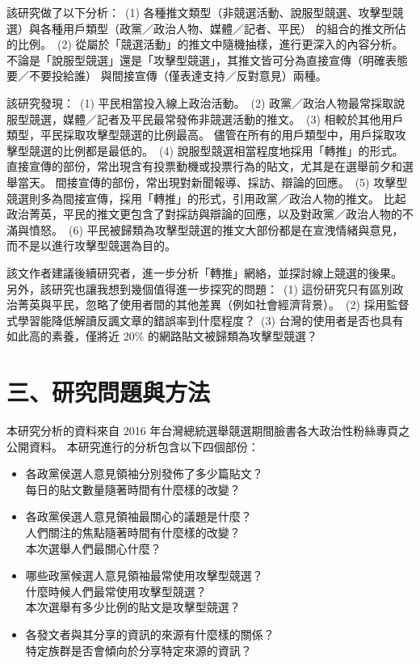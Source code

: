 \documentclass[a4paper, 10pt, conference]{ieeeconf}       %
\begin{document}
\begin{CJK}{UTF8}{bsmi}
該研究做了以下分析：%
\,(1) 各種推文類型（非競選活動、說服型競選、攻擊型競選）與各種用戶類型（政黨／政治人物、媒體／記者、平民）%
的組合的推文所佔的比例。%
\,(2) 從屬於「競選活動」的推文中隨機抽樣，進行更深入的內容分析。%
不論是「說服型競選」還是「攻擊型競選」，其推文皆可分為直接宣傳（明確表態要／不要投給誰）%
與間接宣傳（僅表達支持／反對意見）兩種。%

該研究發現：%
\,(1) 平民相當投入線上政治活動。%
\,(2) 政黨／政治人物最常採取說服型競選，媒體／記者及平民最常發佈非競選活動的推文。%
\,(3) 相較於其他用戶類型，平民採取攻擊型競選的比例最高。%
儘管在所有的用戶類型中，用戶採取攻擊型競選的比例都是最低的。%
\,(4) 說服型競選相當程度地採用「轉推」的形式。%
直接宣傳的部份，常出現含有投票動機或投票行為的貼文，尤其是在選舉前夕和選舉當天。%
間接宣傳的部份，常出現對新聞報導、採訪、辯論的回應。%
\,(5) 攻擊型競選則多為間接宣傳，採用「轉推」的形式，引用政黨／政治人物的推文。%
比起政治菁英，平民的推文更包含了對採訪與辯論的回應，以及對政黨／政治人物的不滿與憤怒。%
\,(6) 平民被歸類為攻擊型競選的推文大部份都是在宣洩情緒與意見，而不是以進行攻擊型競選為目的。%

該文作者建議後續研究者，進一步分析「轉推」網絡，並探討線上競選的後果。%
另外，該研究也讓我想到幾個值得進一步探究的問題：%
\,(1) 這份研究只有區別政治菁英與平民，忽略了使用者間的其他差異（例如社會經濟背景）。%
\,(2) 採用監督式學習能降低解讀反諷文章的錯誤率到什麼程度？%
\,(3) 台灣的使用者是否也具有如此高的素養，僅將近 20\% 的網路貼文被歸類為攻擊型競選？%

\section*{三、研究問題與方法}

本研究分析的資料來自 2016 年台灣總統選舉競選期間臉書各大政治性粉絲專頁之公開資料。%
本研究進行的分析包含以下四個部份：%
\begin{itemize}
\item 各政黨\raisebox{0.1em}{$/$}侯選人\raisebox{0.1em}{$/$}意見領袖分別發佈了多少篇貼文？\\
每日的貼文數量隨著時間有什麼樣的改變？%
\item 各政黨\raisebox{0.1em}{$/$}侯選人\raisebox{0.1em}{$/$}意見領袖最關心的議題是什麼？\\
人們關注的焦點隨著時間有什麼樣的改變？\\
本次選舉人們最關心什麼？%
\item 哪些政黨\raisebox{0.1em}{$/$}候選人\raisebox{0.1em}{$/$}意見領袖最常使用攻擊型競選？\\
什麼時候人們最常使用攻擊型競選？\\
本次選舉有多少比例的貼文是攻擊型競選？%
\item 各發文者與其分享的資訊的來源有什麼樣的關係？\\
特定族群是否會傾向於分享特定來源的資訊？%
\end{itemize}


\end{CJK}
\end{document}
